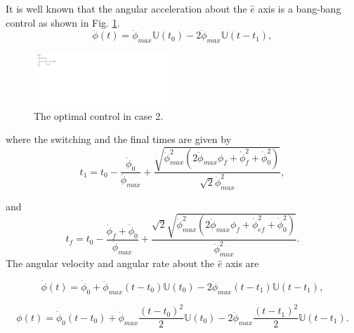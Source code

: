 \documentclass[letterpaper, paper,12pt]{AAS}		%
\begin{document}
	
	 It is well known that the angular acceleration about the $\hat{e}$ axis is a bang-bang control as shown in Fig. \ref{bang_bang}.
	\begin{equation}\label{alpha}
	\ddot{\phi}(t)=\ddot{\phi}_{max}\mathbb{U}(t_0)- 2\ddot{\phi}_{max}\mathbb{U}(t-t_1),
	\end{equation}
	
	\begin{figure}[!ht]
	\begin{center}
	\includegraphics[width=2in]{./Figures/Bang_bang}    
	\caption{The optimal control in case 2.}  
	\label{bang_bang}
	\end{center}
	\end{figure}
	where the switching and the final times are given by
	\begin{equation}
	t_1=t_0-\frac{\dot{\phi}_{0}}{\ddot{\phi}_{max}}+\frac{\sqrt{\ddot{\phi}_{max}^2(2\ddot{\phi}_{max}\phi_{f}+\dot{\phi}_{f}^2+\dot{\phi}_{0}^2)}}{\sqrt{2}\ddot{\phi}_{max}^2},
	\end{equation}
	
	
	and
	\begin{equation}
	t_f=t_0-\frac{\dot{\phi}_{f}+\dot{\phi}_{0}}{\ddot{\phi}_{max}}+\frac{\sqrt{2}\sqrt{\ddot{\phi}_{max}^2(2\ddot{\phi}_{max}\phi_{f}+\dot{\phi}_{ef}^2+\dot{\phi}_{0}^2)}}{\ddot{\phi}_{max}^2}.
	\end{equation}
The angular velocity and angular rate about the $\hat{e}$ axis are

	\begin{equation}\label{omega}
	\dot{\phi}(t)=\dot{\phi}_{0}+\ddot{\phi}_{max}(t-t_0)\mathbb{U}(t_0)- 2\ddot{\phi}_{max}(t-t_1)\mathbb{U}(t-t_1),
	\end{equation}

	\begin{equation}\label{phi}
	\phi(t)=\dot{\phi}_{0}(t-t_0)+\ddot{\phi}_{max}\frac{(t-t_0)^2}{2}\mathbb{U}(t_0)- 2\ddot{\phi}_{max}\frac{(t-t_1)^2}{2}\mathbb{U}(t-t_1).
	\end{equation}
	
\end{document}
